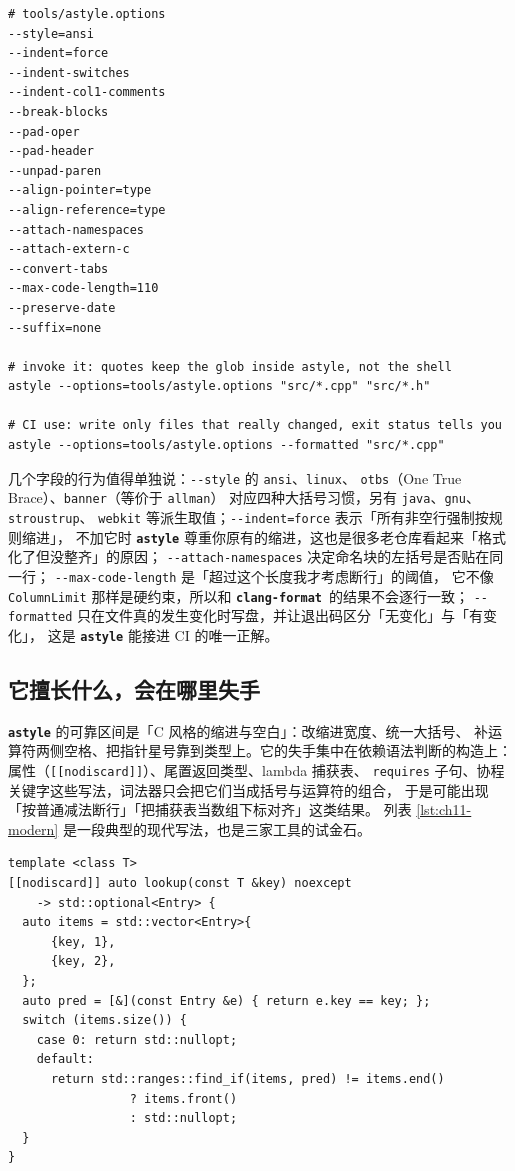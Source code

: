 \documentclass[12pt,a4paper,fontset=fandol]{ctexbook}
\newcommand{\Opt}[1]{\texttt{-\/-#1}}
\newcommand{\Lib}[1]{\textbf{\texttt{#1}}}
\newcommand{\Lang}[1]{\textsf{#1}}
\newcommand{\CL}{\Lang{C}}
\newcommand{\Fmt}{\Lib{clang-format}}
\begin{document}
\begin{lstlisting}[style=shellstyle,caption={一份 \texttt{tools/astyle.options} 与它的调用},label={lst:ch11-astyle}]
# tools/astyle.options
--style=ansi
--indent=force
--indent-switches
--indent-col1-comments
--break-blocks
--pad-oper
--pad-header
--unpad-paren
--align-pointer=type
--align-reference=type
--attach-namespaces
--attach-extern-c
--convert-tabs
--max-code-length=110
--preserve-date
--suffix=none

# invoke it: quotes keep the glob inside astyle, not the shell
astyle --options=tools/astyle.options "src/*.cpp" "src/*.h"

# CI use: write only files that really changed, exit status tells you
astyle --options=tools/astyle.options --formatted "src/*.cpp"
\end{lstlisting}

几个字段的行为值得单独说：\Opt{style} 的 \texttt{ansi}、\texttt{linux}、
\texttt{otbs}（One True Brace）、\texttt{banner}（等价于 \texttt{allman}）
对应四种大括号习惯，另有 \texttt{java}、\texttt{gnu}、\texttt{stroustrup}、
\texttt{webkit} 等派生取值；\Opt{indent=force} 表示「所有非空行强制按规则缩进」，
不加它时 \Lib{astyle} 尊重你原有的缩进，这也是很多老仓库看起来「格式化了但没整齐」的原因；
\Opt{attach-namespaces} 决定命名块的左括号是否贴在同一行；
\Opt{max-code-length} 是「超过这个长度我才考虑断行」的阈值，
它不像 \texttt{ColumnLimit} 那样是硬约束，所以和 \Fmt\ 的结果不会逐行一致；
\Opt{formatted} 只在文件真的发生变化时写盘，并让退出码区分「无变化」与「有变化」，
这是 \Lib{astyle} 能接进 CI 的唯一正解。

\subsection{它擅长什么，会在哪里失手}\label{sec:ch11-s1-scope}

\Lib{astyle} 的可靠区间是「\CL{} 风格的缩进与空白」：改缩进宽度、统一大括号、
补运算符两侧空格、把指针星号靠到类型上。它的失手集中在依赖语法判断的构造上：
属性（\texttt{[[nodiscard]]}）、尾置返回类型、lambda 捕获表、
\texttt{requires} 子句、协程关键字这些写法，词法器只会把它们当成括号与运算符的组合，
于是可能出现「按普通减法断行」「把捕获表当数组下标对齐」这类结果。
列表 \ref{lst:ch11-modern} 是一段典型的现代写法，也是三家工具的试金石。

\begin{lstlisting}[style=cppstyle,caption={一段用于测格式化工具的现代写法},label={lst:ch11-modern}]
template <class T>
[[nodiscard]] auto lookup(const T &key) noexcept
    -> std::optional<Entry> {
  auto items = std::vector<Entry>{
      {key, 1},
      {key, 2},
  };
  auto pred = [&](const Entry &e) { return e.key == key; };
  switch (items.size()) {
    case 0: return std::nullopt;
    default:
      return std::ranges::find_if(items, pred) != items.end()
                 ? items.front()
                 : std::nullopt;
  }
}
\end{lstlisting}
\end{document}
